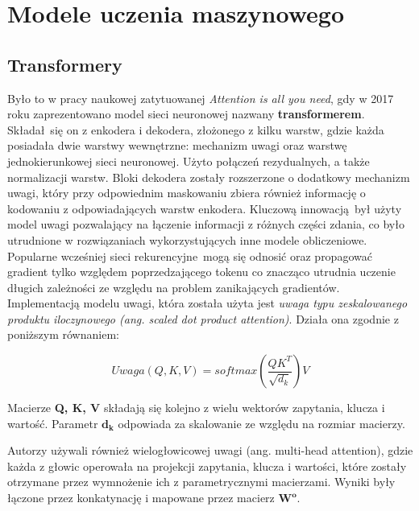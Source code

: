 \section{Modele uczenia maszynowego}


\subsection{Transformery}

Było to w pracy naukowej zatytuowanej \emph{Attention is all you need}, gdy w 2017 roku zaprezentowano model sieci neuronowej nazwany \textbf{transformerem}. Składał się on z enkodera i dekodera, złożonego z kilku warstw, gdzie każda posiadała dwie warstwy wewnętrzne: mechanizm uwagi oraz warstwę jednokierunkowej sieci neuronowej. Użyto połączeń rezydualnych, a także normalizacji warstw. Bloki dekodera zostały rozszerzone o dodatkowy mechanizm uwagi, który przy odpowiednim maskowaniu zbiera również informację o kodowaniu z odpowiadających warstw enkodera. Kluczową innowacją był użyty model uwagi pozwalający na łączenie informacji z różnych części zdania, co było utrudnione w rozwiązaniach wykorzystujących inne modele obliczeniowe. Popularne wcześniej sieci rekurencyjne mogą się odnosić oraz propagować gradient tylko względem poprzedzającego tokenu co znacząco utrudnia uczenie długich zależności ze względu na problem zanikających gradientów. Implementacją modelu uwagi, która została użyta jest \emph{uwaga typu zeskalowanego produktu iloczynowego (ang. scaled dot product attention)}. Działa ona zgodnie z poniższym równaniem: 
\autocite{vaswani2017attention}

\begin{equation}
Uwaga(Q, K, V) = softmax(\frac{QK^T}{\sqrt{d_k}}) V
\end{equation}

Macierze \textbf{Q, K, V} składają się kolejno z wielu wektorów zapytania, klucza i wartość. Parametr $\mathbf{d_k}$ odpowiada za skalowanie ze względu na rozmiar macierzy.\newline 

Autorzy używali również wielogłowicowej uwagi (ang. multi-head attention), gdzie każda z głowic operowała na projekcji zapytania, klucza i wartości, które zostały otrzymane przez wymnożenie ich z parametrycznymi macierzami. Wyniki były łączone przez konkatynację i mapowane przez macierz $\mathbf{W^o}$.\newline

